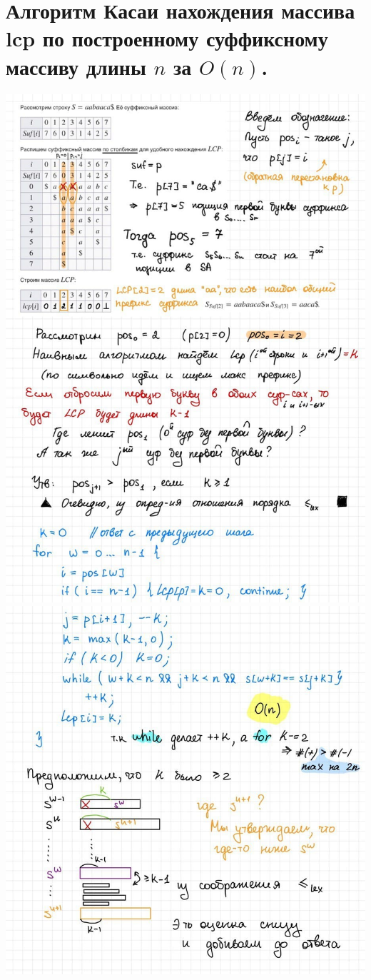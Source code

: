 \section{Алгоритм Касаи нахождения массива lcp по построенному суффиксному массиву длины $n$ за $O(n)$.}
\includegraphics[width=1\linewidth]{images/Kasai1.jpg}
\newpage \includegraphics[width=1\linewidth]{images/Kasai2.jpg}

